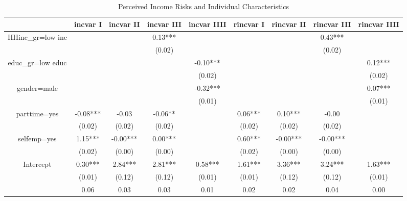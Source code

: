 
\begin{table}[p]
\centering
\begin{adjustbox}{width=\textwidth}
\begin{threeparttable}
\caption{Perceived Income Risks and Individual Characteristics}
\label{micro_reg}\begin{tabular}{ccccccccc}
\toprule
{} &  incvar I & incvar II & incvar III & incvar IIII & rincvar I & rincvar II & rincvar III & rincvar IIII \\
\midrule
HHinc\_gr=low inc &           &           &    0.13*** &             &           &            &     0.43*** &              \\
                 &           &           &     (0.02) &             &           &            &      (0.02) &              \\
educ\_gr=low educ &           &           &            &    -0.10*** &           &            &             &      0.12*** \\
                 &           &           &            &      (0.02) &           &            &             &       (0.02) \\
gender=male      &           &           &            &    -0.32*** &           &            &             &      0.07*** \\
                 &           &           &            &      (0.01) &           &            &             &       (0.01) \\
parttime=yes     &  -0.08*** &     -0.03 &    -0.06** &             &   0.06*** &    0.10*** &       -0.00 &              \\
                 &    (0.02) &    (0.02) &     (0.02) &             &    (0.02) &     (0.02) &      (0.02) &              \\
selfemp=yes      &   1.15*** &  -0.00*** &    0.00*** &             &   0.60*** &   -0.00*** &    -0.00*** &              \\
                 &    (0.02) &    (0.00) &     (0.00) &             &    (0.02) &     (0.00) &      (0.00) &              \\
Intercept        &   0.30*** &   2.84*** &    2.81*** &     0.58*** &   1.61*** &    3.36*** &     3.24*** &      1.63*** \\
                 &    (0.01) &    (0.12) &     (0.12) &      (0.01) &    (0.01) &     (0.12) &      (0.12) &       (0.01) \\
                 &      0.06 &      0.03 &       0.03 &        0.01 &      0.02 &       0.02 &        0.04 &         0.00 \\

\end{tabular}
\end{threeparttable}
\end{adjustbox}
\end{table}
